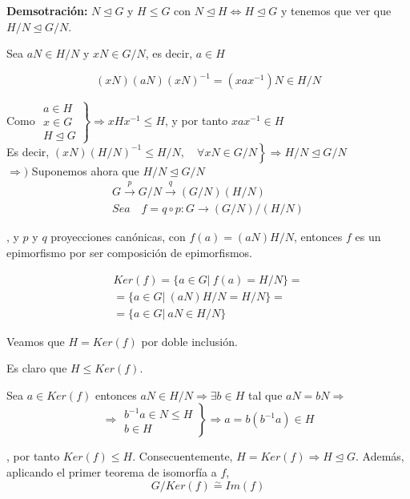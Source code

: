 \documentclass{article}
\begin{document}
\textbf{Demsotración:} $N\unlhd G$ y $H\leq G$ con $N\unlhd H\Leftrightarrow H\unlhd G$ y tenemos que ver que $H/N\unlhd G/N$. 

Sea $aN\in H/N$ y $xN\in G/N$, es decir, $a\in H$

\begin{equation*}
(xN)(aN)(xN)^{-1}=(xax^{-1})N\in H/N
\end{equation*}

Como $\left. \begin{array}{c}
a\in H\\
x\in G\\
H\unlhd G
\end{array}\right\rbrace \Rightarrow xHx^{-1} \leq H$, y por tanto $xax^{-1}\in H$ \\

Es decir, $\left. (xN)(H/N)^{-1}\leq H/N, \quad \forall xN\in G/N \right\rbrace\Rightarrow H/N\unlhd G/N$ \\

$\Rightarrow)$ Suponemos ahora que $H/N\unlhd G/N$
\begin{gather*}
G\overset{p}{\longrightarrow}G/N\overset{q}{\longrightarrow}(G/N)(H/N) \\
Sea \quad f=q\circ p:G\longrightarrow (G/N)/(H/N)
\end{gather*}

, y $p$ y $q$ proyecciones canónicas, con $f(a)=(aN)H/N$, entonces $f$ es un epimorfismo por ser composición de epimorfismos.

\begin{gather*}
Ker(f)=\{a\in G|\:f(a)=H/N\}=\\
=\{a\in G|\:(aN)H/N=H/N\}=\\
=\{a\in G|\:aN\in H/N\}
\end{gather*}

Veamos que $H=Ker(f)$ por doble inclusión. 

Es claro que $H\leq Ker(f)$.

Sea $a\in Ker(f)$ entonces $aN\in H/N\Rightarrow \exists b\in H$ tal que $aN=bN\Rightarrow$
\begin{equation*}
\Rightarrow \left. \begin{array}{c}
b^{-1}a\in N\leq H\\
b\in H
\end{array} \right\rbrace \Rightarrow a=b(b^{-1}a)\in H
\end{equation*}

, por tanto $Ker(f)\leq H$. Consecuentemente, $H=Ker(f)\Rightarrow H\unlhd G$. Además, aplicando el primer teorema de isomorfía a $f$, 
\begin{equation*}
G/Ker(f)\overset{\sim}{=} Im(f)
\end{equation*}
\end{document}
